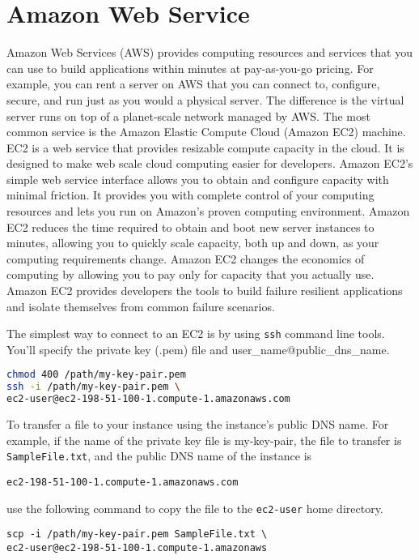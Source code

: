 \section{Amazon Web Service}

Amazon Web Services (AWS) provides computing resources and services that you can use to build applications within minutes at pay-as-you-go pricing. For example, you can rent a server on AWS that you can connect to, configure, secure, and run just as you would a physical server. The difference is the virtual server runs on top of a planet-scale network managed by AWS. The most common service is the Amazon Elastic Compute Cloud (Amazon EC2) machine. EC2 is a web service that provides resizable compute capacity in the cloud. It is designed to make web scale cloud computing easier for developers. Amazon EC2’s simple web service interface allows you to obtain and configure capacity with minimal friction. It provides you with complete control of your computing resources and lets you run on Amazon's proven computing environment. Amazon EC2 reduces the time required to obtain and boot new server instances to minutes, allowing you to quickly scale capacity, both up and down, as your computing requirements change. Amazon EC2 changes the economics of computing by allowing you to pay only for capacity that you actually use. Amazon EC2 provides developers the tools to build failure resilient applications and isolate themselves from common failure scenarios.

The simplest way to connect to an EC2 is by using \texttt{ssh} command line tools. You'll specify the private key (.pem) file and user\_name@public\_dns\_name. 
\begin{lstlisting}[language=bash]
chmod 400 /path/my-key-pair.pem
ssh -i /path/my-key-pair.pem \
ec2-user@ec2-198-51-100-1.compute-1.amazonaws.com
\end{lstlisting}

To transfer a file to your instance using the instance's public DNS name. For example, if the name of the private key file is my-key-pair, the file to transfer is	\texttt{SampleFile.txt}, and the public DNS name of the instance is \begin{lstlisting}
ec2-198-51-100-1.compute-1.amazonaws.com
\end{lstlisting} use the following command to copy the file to the \texttt{ec2-user} home directory.
\begin{lstlisting}
scp -i /path/my-key-pair.pem SampleFile.txt \
ec2-user@ec2-198-51-100-1.compute-1.amazonaws
\end{lstlisting}
